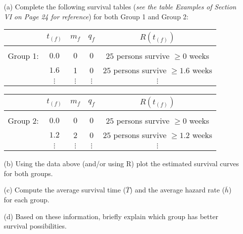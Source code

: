 \documentclass[12pt]{article}
\begin{document}
\begin{itemize}
	\item[(a)] Complete the following survival tables (\textit{see the table Examples of Section VI on Page 24 for reference}) for both Group 1 and Group 2: \\

\begin{center}
\begin{tabular}{ c c c c c }
 & $t_{(f)}$ & $m_{f}$ & $q_{f}$ & $R(t_{(f)})$ \\
 \hline \\ 
 Group 1: & $0.0$ & $0$ & $0$ & $25$ persons survive $\geq 0$ weeks \\  
 & $1.6$ &1  &0  & $25$ persons survive $\geq 1.6$ weeks \\
 & $\vdots$ & $\vdots$ & $\vdots$ & $\vdots$  
\end{tabular}
\end{center}

\begin{center}
\begin{tabular}{ c c c c c }
 & $t_{(f)}$ & $m_{f}$ & $q_{f}$ & $R(t_{(f)})$ \\
 \hline \\ 
 Group 2: & $0.0$ & $0$ & $0$ & $25$ persons survive $\geq 0$ weeks \\  
 & $1.2$ &2  &0  & $25$ persons survive $\geq 1.2$ weeks \\
 & $\vdots$ & $\vdots$ & $\vdots$ & $\vdots$   
\end{tabular}
\end{center}

	\item[(b)] Using the data above (and/or using R) plot the estimated survival curves for both groups.
	
	\item[(c)] Compute the average survival time ($\overline{T}$) and the average hazard rate ($\overline{h}$) for each group.
	
	\item[(d)] Based on these information, briefly explain which group has better survival possibilities.
\end{itemize}
\end{document}
